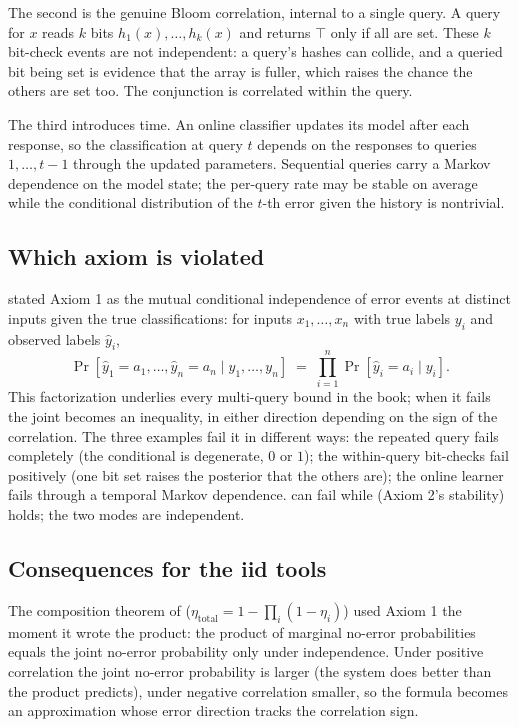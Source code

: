 The second is the genuine Bloom correlation, internal to a single query.
A query for $x$ reads $k$ bits $h_1(x), \ldots, h_k(x)$ and returns $\top$
only if all are set. These $k$ bit-check events are not independent: a
query's hashes can collide, and a queried bit being set is evidence that
the array is fuller, which raises the chance the others are set too. The
conjunction is correlated within the query.

The third introduces time. An online classifier updates its model after
each response, so the classification at query $t$ depends on the
responses to queries $1, \ldots, t-1$ through the updated parameters.
Sequential queries carry a Markov dependence on the model state; the
per-query rate may be stable on average while the conditional
distribution of the $t$-th error given the history is nontrivial.

\subsection*{Which axiom is violated}

 stated Axiom 1 as the mutual conditional independence
of error events at distinct inputs given the true classifications: for
inputs $x_1, \ldots, x_n$ with true labels $y_i$ and observed labels
$\hat y_i$,
\[
  \Pr[\hat{y}_1 = a_1, \ldots, \hat{y}_n = a_n \mid y_1, \ldots, y_n]
  \;=\;
  \prod_{i = 1}^n \Pr[\hat{y}_i = a_i \mid y_i].
\]
This factorization underlies every multi-query bound in the book; when it
fails the joint becomes an inequality, in either direction depending on
the sign of the correlation. The three examples fail it in different
ways: the repeated query fails completely (the conditional is degenerate,
$0$ or $1$); the within-query bit-checks fail positively (one bit set
raises the posterior that the others are); the online learner fails
through a temporal Markov dependence.  can fail
while  (Axiom 2's stability) holds; the two
modes are independent.

\subsection*{Consequences for the iid tools}

The composition theorem of 
($\eta_{\text{total}} = 1 - \prod_i (1 - \eta_i)$) used Axiom 1 the moment
it wrote the product: the product of marginal no-error probabilities
equals the joint no-error probability only under independence. Under
positive correlation the joint no-error probability is larger (the system
does better than the product predicts), under negative correlation
smaller, so the formula becomes an approximation whose error direction
tracks the correlation sign.

